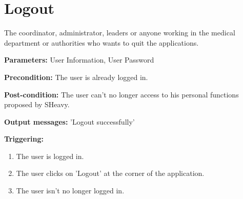 \section{Logout}
\label{operation:Logout}
The coordinator, administrator, leaders or anyone working in the medical
department or authorities who wants to quit the applications.\\
\begin{description}
\item \textbf{Parameters:} User Information, User Password
\item \textbf{Precondition:} The user is already logged in.
\item \textbf{Post-condition:}  The user can't no longer access to his personal
functions proposed by SHeavy.
\item \textbf{Output messages:} 'Logout successfully'
\item \textbf{Triggering:}
\begin{enumerate}
\item The user is logged in.
\item The user clicks on 'Logout' at the corner of the application.
\item The user isn't no longer logged in.
\end{enumerate}
\end{description}

